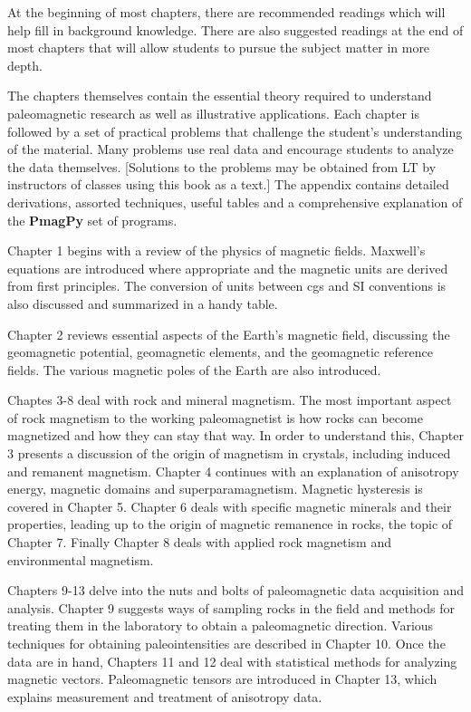  At the beginning of most chapters, there are recommended readings which will help fill in background knowledge.  There are also suggested readings at the end of most chapters that will allow students to pursue the subject matter in more depth.  

The chapters themselves contain the essential theory required to understand paleomagnetic research as well as illustrative applications.  Each chapter is followed by a set of  practical problems that challenge the student's understanding of the material.  Many problems use real  data and encourage students to analyze the data themselves.  [Solutions to the problems may be obtained from LT  by instructors of classes using this book as a text.]    The appendix contains detailed derivations, assorted techniques, useful tables and a comprehensive explanation of the {\bf PmagPy} set of programs.   





Chapter 1 begins with a review of the physics of magnetic fields.
 Maxwell's equations are introduced where
appropriate and the magnetic units are derived from first principles. 
The conversion of units between cgs and SI conventions is also discussed and
summarized in a handy table.


Chapter 2  reviews essential aspects of  the Earth's magnetic field, 
discussing the geomagnetic potential,
geomagnetic elements, and the geomagnetic reference fields. The various
magnetic poles of the Earth are also introduced.   

Chaptes 3-8 deal with rock and mineral magnetism. The most important aspect of rock
magnetism to the working paleomagnetist is how rocks can become magnetized and
how they can stay that way.  In order to understand this, Chapter 3
presents a discussion of the origin of magnetism in crystals,
including induced and remanent magnetism.  Chapter 4 continues with an explanation of  anisotropy energy, magnetic domains and superparamagnetism.  Magnetic hysteresis is covered in Chapter 5.
Chapter 6 deals with specific magnetic minerals and their properties, leading up to the origin of magnetic remanence in rocks, the topic  of Chapter 7.    Finally Chapter 8 deals with applied rock magnetism and environmental magnetism.  

Chapters 9-13  delve into the nuts and bolts of  paleomagnetic data acquisition and analysis.  Chapter 9 suggests ways of sampling rocks in the field and methods for treating them in the laboratory to obtain a paleomagnetic direction.  Various techniques for obtaining paleointensities are described in Chapter 10.  Once the data are in hand, Chapters 11 and 12 deal with statistical methods for analyzing magnetic vectors.  Paleomagnetic tensors are introduced in Chapter 13, which explains measurement and treatment of  anisotropy  data.    

